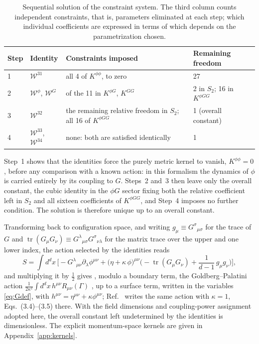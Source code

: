 \documentclass[prd,aps,preprint,superscriptaddress,nofootinbib,amsmath,amssymb,eqsecnum]{revtex4-2}
\newcommand{\W}{\mathcal{W}}
\providecommand{\DIFaddtex}[1]{{\protect\color{blue} \sf #1}} %
\providecommand{\DIFdeltex}[1]{{\protect\color{red} \scriptsize #1}} %
\providecommand{\DIFaddbegin}{} %
\providecommand{\DIFaddend}{} %
\providecommand{\DIFdelbegin}{} %
\providecommand{\DIFdelend}{} %
\providecommand{\DIFadd}[1]{\texorpdfstring{\DIFaddtex{#1}}{#1}} %
\providecommand{\DIFdel}[1]{\texorpdfstring{\DIFdeltex{#1}}{}} %
\begin{document}
\begin{table}[htb]
\centering
\setlength{\tabcolsep}{10pt}
\begin{tabular}{@{}ll>{\raggedright\arraybackslash}p{5.2cm}l@{}}
\toprule
Step & Identity & Constraints imposed & Remaining freedom \\
\midrule
1 & $\W^{31}$ & all 4 of $K^{\phi\phi}$, to zero & 27 \\
2 & $\W^{\phi}$, $\W^{G}$ & 9 of the 11 in $K^{\phi G}$, $K^{GG}$ & 2 in $S_2$; 16 in $K^{\phi GG}$ \\
3 & $\W^{32}$ & the remaining relative freedom in $S_2$; all 16 of $K^{\phi GG}$ & 1 (overall constant) \\
4 & $\W^{33}$, $\W^{34}$ & none: both are satisfied identically & 1 \\
\bottomrule
\end{tabular}
\caption{Sequential solution of the constraint system. The third column counts
independent constraints, that is, parameters eliminated at each step; which individual
coefficients are expressed in terms of which depends on the parametrization chosen.}
\label{tab:flow}
\end{table}

Step~1 shows that the identities force the purely metric kernel to vanish,
$K^{\phi\phi}=0$, before any comparison with a known action: in this formalism the
dynamics of $\phi$ is carried entirely by its coupling to $G$. Steps~2 and~3 then leave only
the overall constant, the cubic identity in the $\phi G$ sector fixing both the relative
coefficient left in $S_2$ and all sixteen coefficients of $K^{\phi GG}$, and Step~4 imposes
no further condition. The solution is therefore unique up to an overall constant.

Transforming back to configuration space, and writing $g_\mu\equiv G^{\sigma}{}_{\mu\sigma}$ for
the trace of $G$ and $\operatorname{tr}(G_\mu G_\nu)\equiv G^{\lambda}{}_{\mu\sigma}G^{\sigma}{}_{\nu\lambda}$
for the matrix trace over the upper and one lower index, the action selected by the identities reads
\begin{equation}
S=\int d^dx\,\Big[-G^{\lambda}{}_{\mu\nu}\partial_\lambda\phi^{\mu\nu}
+\big(\eta+\kappa\,\phi\big)^{\mu\nu}
\Big(-\operatorname{tr}(G_\mu G_\nu)+\frac{1}{d-1}\,g_\mu g_\nu\Big)\Big],
\label{eq:result}
\end{equation}
and multiplying it by $\tfrac12$ gives \DIFdelbegin \DIFdel{, modulo a boundary term, }\DIFdelend the Goldberg--Palatini action
$\frac{1}{2\kappa^2}\int d^dx\,h^{\mu\nu}R_{\mu\nu}(\Gamma)$\DIFaddbegin \DIFadd{, up to a surface term, }\DIFaddend written in the variables
\eqref{eq:Gdef}, with $h^{\mu\nu}=\eta^{\mu\nu}+\kappa\phi^{\mu\nu}$; Ref.~\cite{BrandtMcKeon2016}
writes the same action with $\kappa=1$, Eqs.~(3.4)--(3.5) there. With the field dimensions
and coupling-power assignment adopted here, the overall constant left undetermined by the
identities is dimensionless.
The explicit momentum-space kernels are given in Appendix~\ref{app:kernels}.
\end{document}
